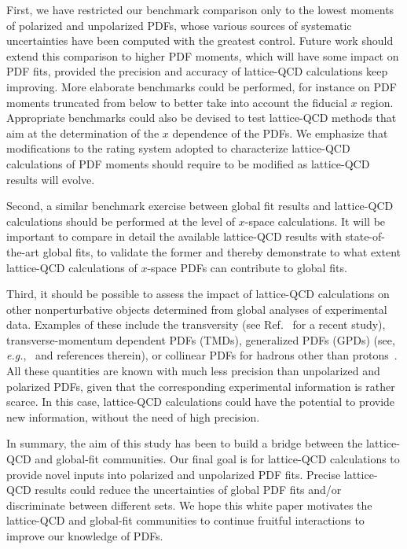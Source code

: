 First, we have restricted our benchmark comparison only to the lowest moments 
of polarized and unpolarized PDFs, whose various sources of systematic 
uncertainties have been computed with the greatest control.
%
Future work should extend this comparison to higher PDF moments,
which will have some impact on PDF fits, provided the precision and accuracy
of lattice-QCD calculations keep improving.
%
More elaborate benchmarks could be performed, for instance on PDF moments
truncated from below to better take into account the fiducial $x$ region.
%
Appropriate benchmarks could also be devised to test lattice-QCD methods
that aim at the determination of the $x$ dependence of the PDFs.
%
We emphasize that modifications to the rating system adopted to
characterize  lattice-QCD calculations of PDF moments should require to 
be modified as lattice-QCD results will evolve.

Second, a similar benchmark exercise between global fit results and 
lattice-QCD calculations should be performed at the level of
$x$-space calculations.
%
It will be important to compare in detail the available lattice-QCD results 
with state-of-the-art global fits, to validate the former and
thereby demonstrate to what extent lattice-QCD calculations of $x$-space PDFs 
can contribute to global fits.

Third, it should be possible to assess the impact of lattice-QCD 
calculations on other nonperturbative objects
determined from global analyses of experimental data.
%
Examples of these include the transversity (see Ref.~\cite{Lin:2017stx}
for a recent study), transverse-momentum dependent 
PDFs (TMDs), generalized PDFs (GPDs) (see, {\it e.g.},~\cite{Angeles-Martinez:2015sea,Musch:2011er,Engelhardt:2015xja,Yoon:2017qzo} and references therein), 
or collinear PDFs for hadrons other than 
protons~\cite{Sutton:1991ay,Burkardt:2001jg}.
%
All these quantities are known with much less precision than unpolarized
and polarized PDFs, given that the corresponding experimental information
is rather scarce. 
%
In this case, lattice-QCD calculations could have the potential
to provide new information, without the need of high precision.

In summary, the aim of this study has been to build a bridge between the 
lattice-QCD and global-fit communities.
%
Our final goal is for lattice-QCD calculations to provide novel inputs into 
polarized and unpolarized PDF fits. 
%
Precise lattice-QCD results could reduce the uncertainties of
global PDF fits and/or discriminate between different sets.
%
We hope this white paper motivates the lattice-QCD and global-fit
communities to continue fruitful interactions to improve our knowledge of PDFs.
